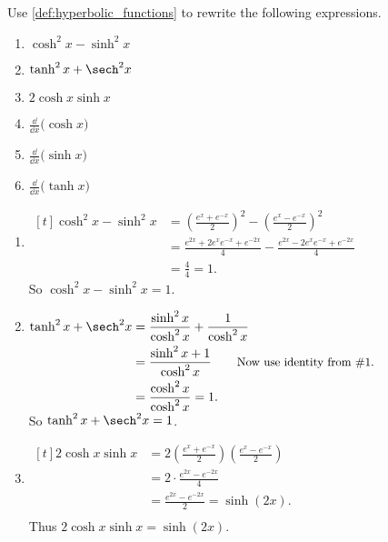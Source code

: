 \begin{example}\label{ex_hf1}%
Use \autoref{def:hyperbolic_functions} to rewrite the following expressions.
\begin{multicols}{2}
\begin{enumerate}
\item		$\cosh^2 x-\sinh^2x$
\item		$\tanh^2 x+\sech^2 x$
\item		$2\cosh x\sinh x$
\item		$\frac{\dd}{\dd x}\bigl(\cosh x\bigr)$
\item		$\frac{\dd}{\dd x}\bigl(\sinh x\bigr)$
\item		$\frac{\dd}{\dd x}\bigl(\tanh x\bigr)$
\end{enumerate}
\end{multicols}
\solution
\begin{enumerate}
\item \hfill$\begin{aligned}[t]
 \cosh^2x-\sinh^2x
 &= \left(\frac{e^x+e^{-x}}2\right)^2 -\left(\frac{e^x-e^{-x}}2\right)^2\\
 &= \frac{e^{2x}+2e^xe^{-x} + e^{-2x}}4 - \frac{e^{2x}-2e^xe^{-x} + e^{-2x}}4\\
 &= \frac44=1.
\end{aligned}$\hfill\null\\
So $\cosh^2 x-\sinh^2x=1$.

\item \hfill$\begin{aligned}[t]
 \tanh^2 x+\sech^2 x
 &=\frac{\sinh^2x}{\cosh^2 x} + \frac{1}{\cosh^2 x} \\
 &= \frac{\sinh^2x+1}{\cosh^2 x}\qquad \text{\small Now use identity from \#1.}\\
 &= \frac{\cosh^2 x}{\cosh^2 x} = 1.
\end{aligned}$\hfill\null\\
So $\tanh^2 x+\sech^2 x=1$.

\item \hfill$\begin{aligned}[t]
	2\cosh x\sinh x
	&= 2\left(\frac{e^x+e^{-x}}2\right)\left(\frac{e^x-e^{-x}}2\right) \\
	&= 2 \cdot\frac{e^{2x} - e^{-2x}}4\\
	&= \frac{e^{2x} - e^{-2x}}2 = \sinh (2x).\\
\end{aligned}$\hfill\null\\
Thus $2\cosh x\sinh x = \sinh (2x)$.


\end{enumerate}
\end{example}
